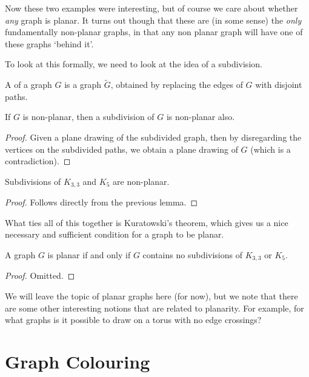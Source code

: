 Now these two examples were interesting, but of course we care about whether \emph{any} graph is planar.  It turns out though that these are (in some sense) the \emph{only} fundamentally non-planar graphs, in that any non planar graph will have one of these graphs `behind it'.

To look at this formally, we need to look at the idea of a subdivision.

\begin{definition}[Subdivision]
	A  of a graph $G$ is a graph $\tilde{G}$, obtained by replacing the edges of $G$ with disjoint paths.
\end{definition}

\begin{lemma}
	If $G$ is non-planar, then a subdivision of $G$ is non-planar also.
\end{lemma}
\begin{proof}
	Given a plane drawing of the subdivided graph, then by disregarding the vertices on the subdivided paths, we obtain a plane drawing of $G$ (which is a contradiction).
\end{proof}

\begin{corollary}\label{cor:planar}
	Subdivisions of $K_{3, 3}$ and $K_5$ are non-planar.
\end{corollary}
\begin{proof}
	Follows directly from the previous lemma.
\end{proof}

What ties all of this together is Kuratowski's theorem, which gives us a nice necessary and sufficient condition for a graph to be planar.

\begin{theorem}
	A graph $G$ is planar if and only if $G$ contains no subdivisions of $K_{3, 3}$ or $K_5$.
\end{theorem}
\begin{proof}
	Omitted.\let\qed\relax
\end{proof}

We will leave the topic of planar graphs here (for now), but we note that there are some other interesting notions that are related to planarity. For example, for what graphs is it possible to draw on a torus with no edge crossings?

\section{Graph Colouring}

